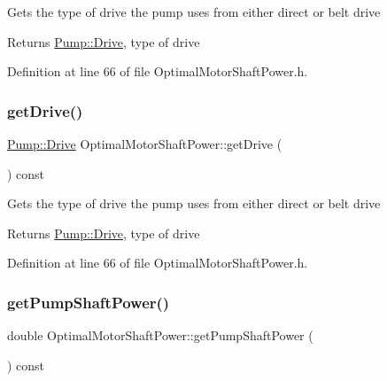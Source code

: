 Gets the type of drive the pump uses from either direct or belt drive

\begin{DoxyReturn}{Returns}
\hyperlink{class_pump_a32bf0ade131a11bb3b3fb374f638e983}{Pump\+::\+Drive}, type of drive 
\end{DoxyReturn}


Definition at line 66 of file Optimal\+Motor\+Shaft\+Power.\+h.

\mbox{\label{class_optimal_motor_shaft_power_a23e1045bb2e3ee62205276cbbebbc3ad}} 
\subsubsection{\texorpdfstring{get\+Drive()}{getDrive()}\hspace{0.1cm}{\footnotesize\ttfamily [3/3]}}
{\footnotesize\ttfamily \hyperlink{class_pump_a32bf0ade131a11bb3b3fb374f638e983}{Pump\+::\+Drive} Optimal\+Motor\+Shaft\+Power\+::get\+Drive (\begin{DoxyParamCaption}{ }\end{DoxyParamCaption}) const\hspace{0.3cm}{\ttfamily [inline]}}

Gets the type of drive the pump uses from either direct or belt drive

\begin{DoxyReturn}{Returns}
\hyperlink{class_pump_a32bf0ade131a11bb3b3fb374f638e983}{Pump\+::\+Drive}, type of drive 
\end{DoxyReturn}


Definition at line 66 of file Optimal\+Motor\+Shaft\+Power.\+h.

\mbox{\label{class_optimal_motor_shaft_power_aca7bb632c659ecf2ebf3cb9fdb23626f}} 
\subsubsection{\texorpdfstring{get\+Pump\+Shaft\+Power()}{getPumpShaftPower()}\hspace{0.1cm}{\footnotesize\ttfamily [1/3]}}
{\footnotesize\ttfamily double Optimal\+Motor\+Shaft\+Power\+::get\+Pump\+Shaft\+Power (\begin{DoxyParamCaption}{ }\end{DoxyParamCaption}) const\hspace{0.3cm}{\ttfamily [inline]}}

